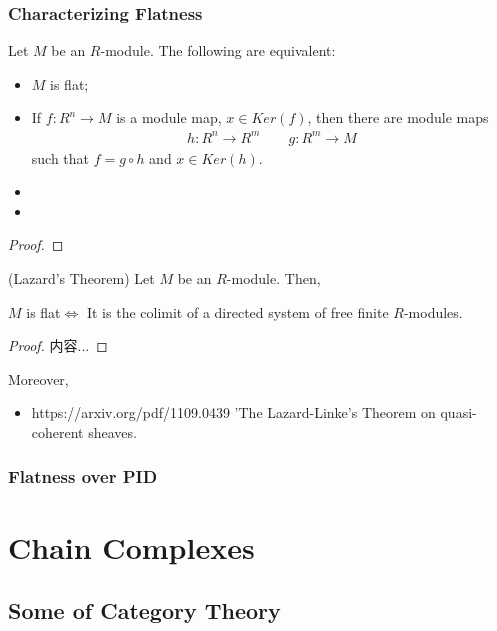 \documentclass[Total.tex]{subfiles}
\begin{document}
			\subsection{Characterizing Flatness}
				\begin{lemma}
					Let $M$ be an $R$-module. The following are equivalent:
					\begin{itemize}
						\item $M$ is flat;
						\item If $f:R^n\rightarrow M$ is a module map, $x\in Ker(f)$, then there are module maps
						\begin{gather*}
							h:R^n\rightarrow R^m\qquad g:R^m\rightarrow M
						\end{gather*}
						such that $f=g\circ h$ and $x\in Ker(h)$.
						\item 
						\item 
					\end{itemize}
				\end{lemma}
				\begin{proof}
				
				\end{proof}
				
				\begin{theorem}
					(Lazard's Theorem) Let $M$ be an $R$-module. Then,
					
					$M$ is flat$\Leftrightarrow$ It is the colimit of a directed system of free finite $R$-modules.
				\end{theorem}
				\begin{proof}
					内容...
				\end{proof}
				
				Moreover, 
				\begin{itemize}
					\item https://arxiv.org/pdf/1109.0439 'The Lazard-Linke's Theorem on quasi-coherent sheaves.
				\end{itemize}
			\subsection{Flatness over PID}
				
	\chapter{Chain Complexes}
		\section{Some of Category Theory}
\end{document}
